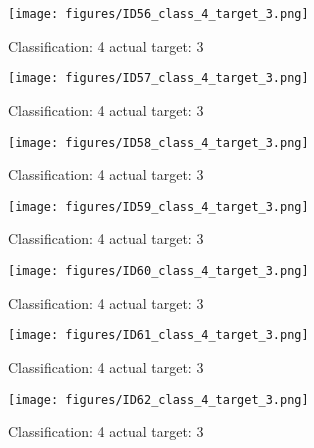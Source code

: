 \begin{figure}[h!]
\begin{center}
\texttt{[image: figures/ID56\_class\_4\_target\_3.png]}
\end{center}
\caption{ Classification: 4 actual target: 3}
\label{fig:ID56_class_4_target_3}
\end{figure}
\begin{figure}[h!]
\begin{center}
\texttt{[image: figures/ID57\_class\_4\_target\_3.png]}
\end{center}
\caption{ Classification: 4 actual target: 3}
\label{fig:ID57_class_4_target_3}
\end{figure}
\begin{figure}[h!]
\begin{center}
\texttt{[image: figures/ID58\_class\_4\_target\_3.png]}
\end{center}
\caption{ Classification: 4 actual target: 3}
\label{fig:ID58_class_4_target_3}
\end{figure}
\begin{figure}[h!]
\begin{center}
\texttt{[image: figures/ID59\_class\_4\_target\_3.png]}
\end{center}
\caption{ Classification: 4 actual target: 3}
\label{fig:ID59_class_4_target_3}
\end{figure}
\begin{figure}[h!]
\begin{center}
\texttt{[image: figures/ID60\_class\_4\_target\_3.png]}
\end{center}
\caption{ Classification: 4 actual target: 3}
\label{fig:ID60_class_4_target_3}
\end{figure}
\begin{figure}[h!]
\begin{center}
\texttt{[image: figures/ID61\_class\_4\_target\_3.png]}
\end{center}
\caption{ Classification: 4 actual target: 3}
\label{fig:ID61_class_4_target_3}
\end{figure}
\begin{figure}[h!]
\begin{center}
\texttt{[image: figures/ID62\_class\_4\_target\_3.png]}
\end{center}
\caption{ Classification: 4 actual target: 3}
\label{fig:ID62_class_4_target_3}
\end{figure}
